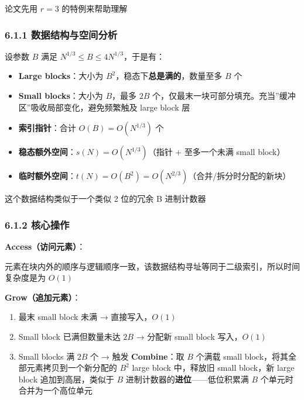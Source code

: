 \documentclass[
  UTF8,
  a4paper,
  12pt]{ctexart}
\providecommand{\tightlist}{%
  \setlength{\itemsep}{0pt}\setlength{\parskip}{0pt}}
\begin{document}
论文先用 \(r=3\) 的特例来帮助理解

\subsubsection{6.1.1
数据结构与空间分析}\label{ux6570ux636eux7ed3ux6784ux4e0eux7a7aux95f4ux5206ux6790}

设参数 \(B\) 满足 \(N^{1/3} \le B \le 4N^{1/3}\)，于是有：

\begin{itemize}
\tightlist
\item
  \textbf{Large blocks}：大小为
  \(B^2\)，稳态下\textbf{总是满的}，数量至多 \(B\) 个
\item
  \textbf{Small blocks}：大小为 \(B\)，最多 \(2B\)
  个，仅最末一块可部分填充。充当''缓冲区''吸收局部变化，避免频繁触及
  large block 层
\item
  \textbf{索引指针}：合计 \(O(B) = O(N^{1/3})\) 个
\item
  \textbf{稳态额外空间}：\(s(N) = O(N^{1/3})\)（指针 + 至多一个未满
  small block）
\item
  \textbf{临时额外空间}：\(t(N) = O(B^2) = O(N^{2/3})\)（合并/拆分时分配的新块）
\end{itemize}

这个数据结构类似于一个类似 2 位的冗余 B 进制计数器

\subsubsection{6.1.2 核心操作}\label{ux6838ux5fc3ux64cdux4f5c}

\textbf{Access（访问元素）}：

元素在块内外的顺序与逻辑顺序一致，该数据结构寻址等同于二级索引，所以时间复杂度是为
\(O(1)\)

\textbf{Grow（追加元素）}：

\begin{enumerate}
\def\labelenumi{\arabic{enumi}.}
\tightlist
\item
  最末 small block 未满 → 直接写入，\(O(1)\)
\item
  Small block 已满但数量未达 \(2B\) → 分配新 small block 写入，\(O(1)\)
\item
  Small blocks 满 \(2B\) 个 → 触发 \textbf{Combine}：取 \(B\) 个满载
  small block，将其全部元素拷贝到一个新分配的 \(B^2\) large block
  中，释放旧 small block，新 large block 追加到高层，类似于 \(B\)
  进制计数器的\textbf{进位}------低位积累满 \(B\)
  个单元时合并为一个高位单元
\end{enumerate}
\end{document}
